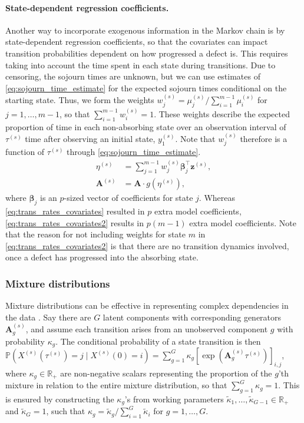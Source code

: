 \documentclass{article}
\begin{document}
\paragraph{State-dependent regression coefficients.}
Another way to incorporate exogenous information in the Markov chain is by state-dependent regression coefficients, so that the covariates can impact transition probabilities dependent on how progressed a defect is. This requires taking into account the time spent in each state during transitions. Due to censoring, the sojourn times are unknown, but we can use estimates of \cref{eq:sojourn_time_estimate} for the expected sojourn times conditional on the starting state. Thus, we form the weights
$
w_j^{(s)} = \mu_j^{(s)} / \sum_{i = 1}^{m-1} \mu_i^{(s)}
$ for $j = 1, \dots, m-1$, so that $\sum_{i = 1}^{m-1} w_i^{(s)} = 1$. 
These weights describe the expected proportion of time in each non-absorbing state over an observation interval of $\tau^{(s)}$ time after observing an initial state, $y_1^{(s)}$. Note that $w_j^{(s)}$ therefore is a function of $\tau^{(s)}$ through \cref{eq:sojourn_time_estimate}.
\begin{equation}
\begin{aligned}
	\eta^{(s)} &=  \sum_{j =1}^{m-1} w_j^{(s)}  \bm \beta_j^\top \bm{z}^{(s)} , \\\bm{A}^{(s)} &= \bm{A} \cdot g\left( \eta^{(s)} \right),
\end{aligned} \label{eq:trans_rates_covariates2}
\end{equation}
where $\bm \beta_j$ is an $p$-sized vector of coefficients for state $j$. Whereas \cref{eq:trans_rates_covariates} resulted in $p$ extra model coefficients, \cref{eq:trans_rates_covariates2} results in $p(m-1)$ extra model coefficients. Note that the reason for not including weights for state $m$ in \cref{eq:trans_rates_covariates2} is that there are no transition dynamics involved, once a defect has progressed into the absorbing state.






\subsubsection{Mixture distributions} \label{sec:mixture}
Mixture distributions can be effective in representing complex dependencies in the data \citep{frydman2024,Bisgaard2026}.
Say there are $G$ latent components with corresponding generators $\bm A_g^{(s)}$, and assume each transition arises from an unobserved component $g$ with probability $\kappa_g$.
The conditional probability of a state transition is then
$
\mathbb P\left( X^{(s)}(\tau^{(s)}) = j \mid X^{(s)}(0) = i \right) = \sum_{g = 1}^G \kappa_g \left[ \exp( \bm A_g^{(s)} \tau^{(s)}) \right]_{i,j}
$, where $\kappa_g \in \mathbb R_+$ are non-negative scalars representing the proportion of the $g$'th mixture in relation to the entire mixture distribution, so that $ \sum_{g = 1}^G \kappa_g = 1$. This is ensured by constructing the $\kappa_g$'s from working parameters $\tilde\kappa_1,\dots,\tilde\kappa_{G-1}\in\mathbb R_+$ and $\tilde\kappa_G = 1$, such that $\kappa_g = \widetilde{\kappa}_g / \sum_{i=1}^G \widetilde{\kappa}_i$ for $g = 1, \dots, G$.
\end{document}
